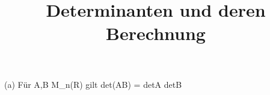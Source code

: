 \documentclass[11pt]{article}
\begin{document}
    \title{Determinanten und deren Berechnung}
    \maketitle
    

    (a) Für A,B \in M_{n}(R) gilt
            det(AB) = detA \cdot detB
\end{document}

